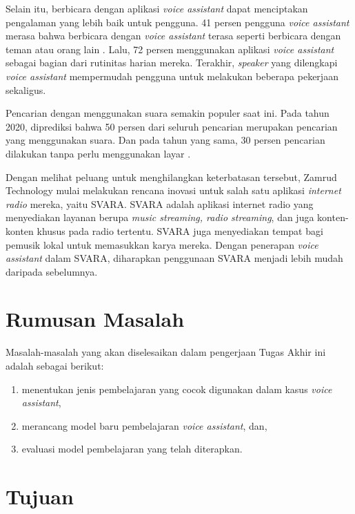 Selain itu, berbicara dengan aplikasi \textit{voice assistant} dapat menciptakan pengalaman yang lebih baik untuk pengguna. 41 persen pengguna \textit{voice assistant} merasa bahwa berbicara dengan \textit{voice assistant} terasa seperti berbicara dengan teman atau orang lain \parencite{kleinberg2018five}. Lalu, 72 persen menggunakan aplikasi \textit{voice assistant} sebagai bagian dari rutinitas harian mereka. Terakhir, \textit{speaker} yang dilengkapi \textit{voice assistant} mempermudah pengguna untuk melakukan beberapa pekerjaan sekaligus.

Pencarian dengan menggunakan suara semakin populer saat ini. Pada tahun 2020, diprediksi bahwa 50 persen dari seluruh pencarian merupakan pencarian yang menggunakan suara. Dan pada tahun yang sama, 30 persen pencarian dilakukan tanpa perlu menggunakan layar \parencite{kleinberg2018five}.

Dengan melihat peluang untuk menghilangkan keterbatasan tersebut, Zamrud Technology mulai melakukan rencana inovasi untuk salah satu aplikasi \textit{internet radio} mereka, yaitu SVARA. SVARA adalah aplikasi internet radio yang menyediakan layanan berupa \textit{music streaming, radio streaming}, dan juga konten-konten khusus pada radio tertentu. SVARA juga menyediakan tempat bagi pemusik lokal untuk memasukkan karya mereka. Dengan penerapan \textit{voice assistant} dalam SVARA, diharapkan penggunaan SVARA menjadi lebih mudah daripada sebelumnya.

\section{Rumusan Masalah}

Masalah-masalah yang akan diselesaikan dalam pengerjaan Tugas Akhir ini adalah sebagai berikut:

\begin{enumerate}
    \item menentukan jenis pembelajaran yang cocok digunakan dalam kasus \textit{voice assistant},
    \item merancang model baru pembelajaran \textit{voice assistant}, dan,
    \item evaluasi model pembelajaran yang telah diterapkan.
\end{enumerate}

\section{Tujuan}

